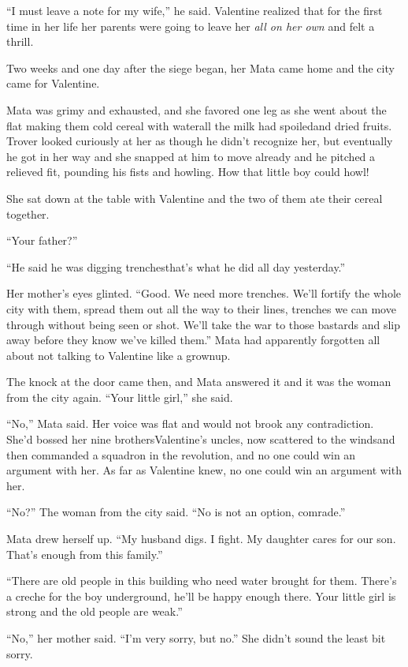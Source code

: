 “I must leave a note for my wife,” he said. Valentine realized that
for the first time in her life her parents were going to leave her
\emph{all on her own} and felt a thrill.

\tb

Two weeks and one day after the siege began, her Mata came home and
the city came for Valentine.

Mata was grimy and exhausted, and she favored one leg as she went
about the flat making them cold cereal with water\dash{}all the milk had
spoiled\dash{}and dried fruits. Trover looked curiously at her as though
he didn’t recognize her, but eventually he got in her way and she
snapped at him to move already and he pitched a relieved fit,
pounding his fists and howling. How that little boy could howl!

She sat down at the table with Valentine and the two of them ate
their cereal together.

“Your father?”

“He said he was digging trenches\dash{}that’s what he did all day
yesterday.”

Her mother’s eyes glinted. “Good. We need more trenches. We’ll
fortify the whole city with them, spread them out all the way to
their lines, trenches we can move through without being seen or
shot. We’ll take the war to those bastards and slip away before
they know we’ve killed them.” Mata had apparently forgotten all
about not talking to Valentine like a grownup.

The knock at the door came then, and Mata answered it and it was
the woman from the city again. “Your little girl,” she said.

“No,” Mata said. Her voice was flat and would not brook any
contradiction. She’d bossed her nine brothers\dash{}Valentine’s uncles,
now scattered to the winds\dash{}and then commanded a squadron in the
revolution, and no one could win an argument with her. As far as
Valentine knew, no one could win an argument with her.

“No?” The woman from the city said. “No is not an option,
comrade.”

Mata drew herself up. “My husband digs. I fight. My daughter cares
for our son. That’s enough from this family.”

“There are old people in this building who need water brought for
them. There’s a creche for the boy underground, he’ll be happy
enough there. Your little girl is strong and the old people are
weak.”

“No,” her mother said. “I’m very sorry, but no.” She didn’t sound
the least bit sorry.

